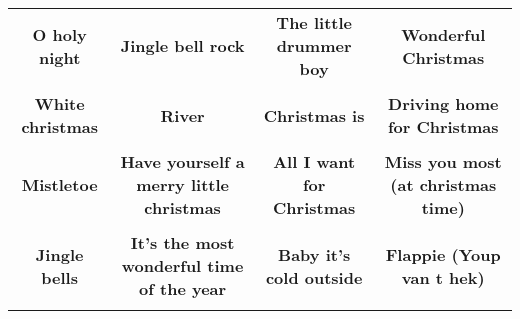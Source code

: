 \documentclass[12pt]{article} \usepackage{eso-pic, graphicx}
\newcommand{\background}[1]{%
\AddToShipoutPictureBG*{\texttt{[image: \#1]}}
}
\begin{document}
\tabcolsep=30.2pt \renewcommand{\arraystretch}{4.5}   \vspace*{4.3cm} \begin{center}  \begin{tabular}{c c c c}
\parbox{3cm}{\centering \textbf{O holy night}}& 
\parbox{3cm}{\centering \textbf{Jingle bell rock}}& 
\parbox{3cm}{\centering \textbf{The little drummer boy}}& 
\parbox{3cm}{\centering \textbf{Wonderful Christmas}}\\ \\ 
\parbox{3cm}{\centering \textbf{White christmas}}& 
\parbox{3cm}{\centering \textbf{River}}& 
\parbox{3cm}{\centering \textbf{Christmas is}}& 
\parbox{3cm}{\centering \textbf{Driving home for Christmas}}\\ \\ 
\parbox{3cm}{\centering \textbf{Mistletoe}}& 
\parbox{3cm}{\centering \textbf{Have yourself a merry little christmas}}& 
\parbox{3cm}{\centering \textbf{All I want for Christmas}}& 
\parbox{3cm}{\centering \textbf{Miss you most (at christmas time)}}\\ \\ 
\parbox{3cm}{\centering \textbf{Jingle bells}}& 
\parbox{3cm}{\centering \textbf{It’s the most wonderful time of the year}}& 
\parbox{3cm}{\centering \textbf{Baby it’s cold outside}}& 
\parbox{3cm}{\centering \textbf{Flappie (Youp van t hek)}}\\ \\ 
\end{tabular} \background{discobingo.pdf} \end{center} 
\end{document}
